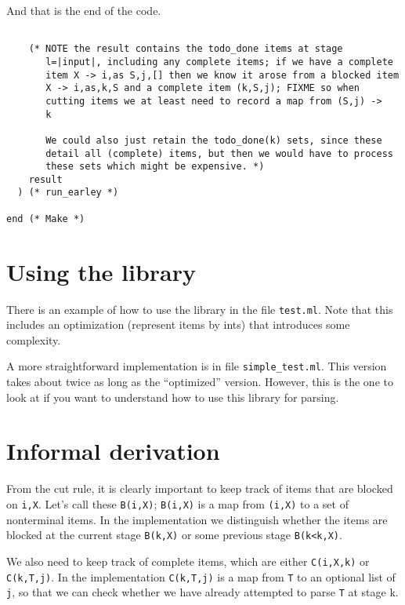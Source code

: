 \documentclass[]{article}
\begin{document}
\begin{multicols}{2}
\begin{verbatim}
\end{verbatim}

And that is the end of the code.

\begin{verbatim}

    (* NOTE the result contains the todo_done items at stage
       l=|input|, including any complete items; if we have a complete
       item X -> i,as S,j,[] then we know it arose from a blocked item
       X -> i,as,k,S and a complete item (k,S,j); FIXME so when
       cutting items we at least need to record a map from (S,j) ->
       k 

       We could also just retain the todo_done(k) sets, since these
       detail all (complete) items, but then we would have to process
       these sets which might be expensive. *)
    result
  ) (* run_earley *)

end (* Make *)
\end{verbatim}

\section{Using the library}

There is an example of how to use the library in the file
\texttt{test.ml}. Note that this includes an optimization (represent
items by ints) that introduces some complexity.

A more straightforward implementation is in file
\texttt{simple\_test.ml}. This version takes about twice as long as the
``optimized'' version. However, this is the one to look at if you want
to understand how to use this library for parsing.

\section{Informal derivation}

From the cut rule, it is clearly important to keep track of items that
are blocked on \texttt{i,X}. Let's call these \texttt{B(i,X)};
\texttt{B(i,X)} is a map from \texttt{(i,X)} to a set of nonterminal
items. In the implementation we distinguish whether the items are
blocked at the current stage \texttt{B(k,X)} or some previous stage
\texttt{B(k\textquotesingle{}\textless{}k,X)}.

We also need to keep track of complete items, which are either
\texttt{C(i,X,k)} or \texttt{C(k,T,j)}. In the implementation
\texttt{C(k,T,j)} is a map from \texttt{T} to an optional list of
\texttt{j}, so that we can check whether we have already attempted to
parse \texttt{T} at stage k.


\end{multicols}
\end{document}
